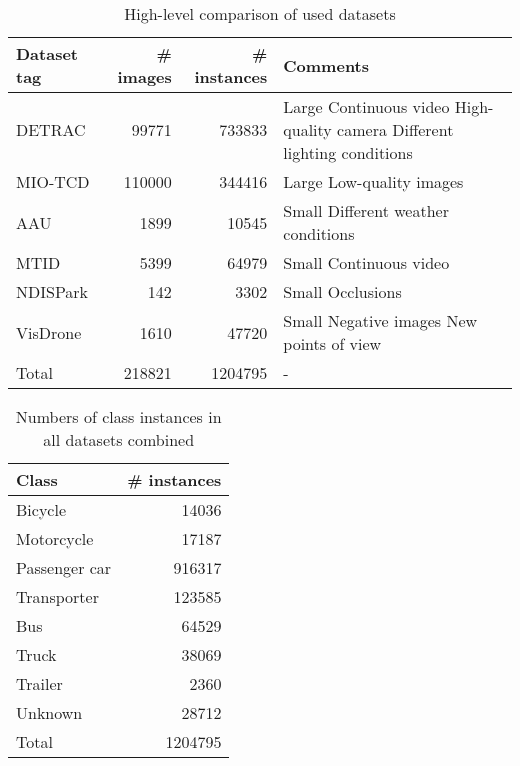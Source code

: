 \begin{table}[t]
\centering
\label{DatasetsSummary}
\begin{tabular}{|l|rr|p{5cm}|}
    \hline
    Dataset tag & \# images & \# instances & Comments \\
    \hline
    DETRAC      &  \num{99771}  & \num{733833} & Large \newline Continuous video \newline High-quality camera \newline Different lighting conditions \\
    \hline
    MIO-TCD     &  \num{110000} & \num{344416} & Large \newline Low-quality images \\
    \hline
    AAU         &    \num{1899} &  \num{10545} & Small \newline Different weather conditions \\
    \hline
    MTID        &    \num{5399} &  \num{64979} & Small \newline Continuous video \\
    \hline
    NDISPark    &     \num{142} &   \num{3302} & Small \newline Occlusions \\
    \hline
    VisDrone    &    \num{1610} &  \num{47720} & Small \newline Negative images \newline New points of view \\
    \hline
    \hline
    Total       &  \num{218821} & \num{1204795} & - \\
    \hline
\end{tabular}
\caption{High-level comparison of used datasets}
\end{table}

\begin{table}[t]
\centering
\label{DatasetsCounts}
\begin{tabular}{|l|r|}
    \hline
    Class         & \# instances \\
    \hline
    Bicycle       &  \num{14036} \\
    Motorcycle    &  \num{17187} \\
    Passenger car & \num{916317} \\
    Transporter   & \num{123585} \\
    Bus           &  \num{64529} \\
    Truck         &  \num{38069} \\
    Trailer       &   \num{2360} \\
    Unknown       &  \num{28712} \\
    \hline
    \hline
    Total         & \num{1204795} \\
    \hline
\end{tabular}
\caption{Numbers of class instances in all datasets combined}
\end{table}


